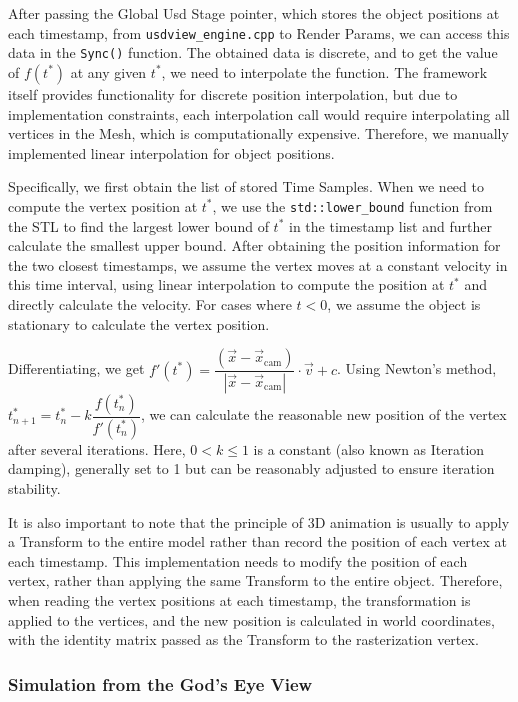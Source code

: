 \documentclass{article}
\begin{document}
After passing the Global Usd Stage pointer, which stores the object positions at each timestamp, from \lstinline|usdview_engine.cpp| to Render Params, we can access this data in the \lstinline|Sync()| function. The obtained data is discrete, and to get the value of $f(t^{*})$ at any given $t^{*}$, we need to interpolate the function. The framework itself provides functionality for discrete position interpolation, but due to implementation constraints, each interpolation call would require interpolating all vertices in the Mesh, which is computationally expensive. Therefore, we manually implemented linear interpolation for object positions.

Specifically, we first obtain the list of stored Time Samples. When we need to compute the vertex position at $t^{*}$, we use the \lstinline|std::lower_bound| function from the STL to find the largest lower bound of $t^{*}$ in the timestamp list and further calculate the smallest upper bound. After obtaining the position information for the two closest timestamps, we assume the vertex moves at a constant velocity in this time interval, using linear interpolation to compute the position at $t^{*}$ and directly calculate the velocity. For cases where $t<0$, we assume the object is stationary to calculate the vertex position.

Differentiating, we get $f'(t^{*})=\dfrac{(\vec x - \vec x_{\text{cam}})}{|\vec x - \vec x_{\text{cam}}|} \cdot \vec v+c$. Using Newton's method, $t_{n+1}^{*}=t_{n}^{*}-k\dfrac{f(t_{n}^{*})}{f'(t_{n}^{*})}$, we can calculate the reasonable new position of the vertex after several iterations. Here, $0<k \le 1$ is a constant (also known as Iteration damping), generally set to 1 but can be reasonably adjusted to ensure iteration stability.

It is also important to note that the principle of 3D animation is usually to apply a Transform to the entire model rather than record the position of each vertex at each timestamp. This implementation needs to modify the position of each vertex, rather than applying the same Transform to the entire object. Therefore, when reading the vertex positions at each timestamp, the transformation is applied to the vertices, and the new position is calculated in world coordinates, with the identity matrix passed as the Transform to the rasterization vertex.

\subsubsection*{Simulation from the God’s Eye View}
\end{document}
